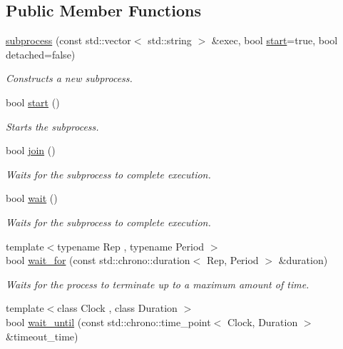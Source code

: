 \subsection*{Public Member Functions}
\begin{DoxyCompactItemize}
\item 
\hyperlink{classcpen333_1_1process_1_1posix_1_1subprocess_a427822d8d77afa1014a0d10a5f50aa14}{subprocess} (const std\+::vector$<$ std\+::string $>$ \&exec, bool \hyperlink{classcpen333_1_1process_1_1posix_1_1subprocess_a8738add1094b2dda57b9ffb8ec6828c1}{start}=true, bool detached=false)
\begin{DoxyCompactList}\small\item\em Constructs a new subprocess. \end{DoxyCompactList}\item 
bool \hyperlink{classcpen333_1_1process_1_1posix_1_1subprocess_a8738add1094b2dda57b9ffb8ec6828c1}{start} ()
\begin{DoxyCompactList}\small\item\em Starts the subprocess. \end{DoxyCompactList}\item 
bool \hyperlink{classcpen333_1_1process_1_1posix_1_1subprocess_af711962e3b6649476bd8cbbd6c59ea8b}{join} ()
\begin{DoxyCompactList}\small\item\em Waits for the subprocess to complete execution. \end{DoxyCompactList}\item 
bool \hyperlink{classcpen333_1_1process_1_1posix_1_1subprocess_a8928b9937577c0ec288318b2176156a0}{wait} ()
\begin{DoxyCompactList}\small\item\em Waits for the subprocess to complete execution. \end{DoxyCompactList}\item 
{\footnotesize template$<$typename Rep , typename Period $>$ }\\bool \hyperlink{classcpen333_1_1process_1_1posix_1_1subprocess_a1543488d24eaf0f819e81f31d9d388cb}{wait\+\_\+for} (const std\+::chrono\+::duration$<$ Rep, Period $>$ \&duration)
\begin{DoxyCompactList}\small\item\em Waits for the process to terminate up to a maximum amount of time. \end{DoxyCompactList}\item 
{\footnotesize template$<$class Clock , class Duration $>$ }\\bool \hyperlink{classcpen333_1_1process_1_1posix_1_1subprocess_a10ea54174a30dd26c0d1ff289b88cd42}{wait\+\_\+until} (const std\+::chrono\+::time\+\_\+point$<$ Clock, Duration $>$ \&timeout\+\_\+time)

\end{DoxyCompactItemize}
